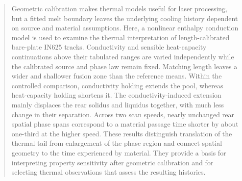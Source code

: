 \begin{abstract}
Geometric calibration makes thermal models useful for laser processing, but a fitted melt boundary leaves the underlying cooling history dependent on source and material assumptions. Here, a nonlinear enthalpy conduction model is used to examine the thermal interpretation of length-calibrated bare-plate IN625 tracks. Conductivity and sensible heat-capacity continuations above their tabulated ranges are varied independently while the calibrated source and phase law remain fixed. Matching length leaves a wider and shallower fusion zone than the reference means. Within the controlled comparison, conductivity holding extends the pool, whereas heat-capacity holding shortens it. The conductivity-induced extension mainly displaces the rear solidus and liquidus together, with much less change in their separation. Across two scan speeds, nearly unchanged rear spatial phase spans correspond to a material passage time shorter by about one-third at the higher speed. These results distinguish translation of the thermal tail from enlargement of the phase region and connect spatial geometry to the time experienced by material. They provide a basis for interpreting property sensitivity after geometric calibration and for selecting thermal observations that assess the resulting histories.
\end{abstract}
